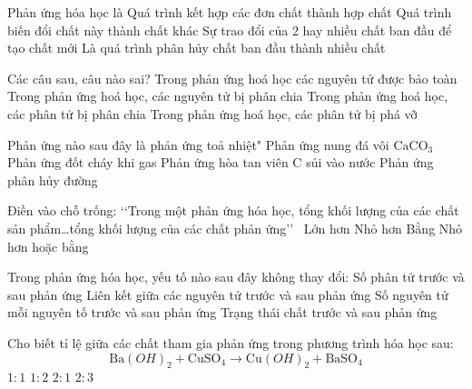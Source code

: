 \begin{ex}
	Phản ứng hóa học là
	\choice
	{Quá trình kết hợp các đơn chất thành hợp chất}
	{Quá trình biến đổi chất này thành chất khác}
	{Sự trao đổi của 2 hay nhiều chất ban đầu để tạo chất mới}
	{Là quá trình phân hủy chất ban đầu thành nhiều chất}
	\loigiai{}
\end{ex}

\begin{ex}
	Các câu sau, câu nào sai?
	\choice
	{Trong phản ứng hoá học các nguyên tử được bảo toàn}
	{Trong phản ứng hoá học, các nguyên tử bị phân chia}
	{Trong phản ứng hoá học, các phân tử bị phân chia}
	{Trong phản ứng hoá học, các phân tử bị phá vỡ}
	\loigiai{}
\end{ex}

\begin{ex}
	Phản ứng nào sau đây là phản ứng toả nhiệt"
	\choice
	{Phản ứng nung đá vôi $\mathrm{CaCO}_3$}
	{Phản ứng đốt cháy khi gas}
	{Phản ứng hòa tan viên C sủi vào nước}
	{Phản ứng phân hủy đường}
	\loigiai{}
\end{ex}

\begin{ex}
	Điền vào chỗ trống: \lq\lq Trong một phản ứng hóa học, tổng khối lượng của các chất sản phẩm\ldots tổng khối lượng của các chất phản ứng\rq\rq\
	\choice
	{Lớn hơn}
	{Nhỏ hơn}
	{Bằng}
	{Nhỏ hơn hoặc bằng}
	\loigiai{}
\end{ex}

\begin{ex}
	Trong phản ứng hóa học, yếu tố nào sau đây không thay đổi:
	\choice
	{Số phân tử trước và sau phản ứng}
	{Liên kết giữa các nguyên tử trước và sau phản ứng}
	{Số nguyên tử mỗi nguyên tố trước và sau phản ứng}
	{Trạng thái chất trước và sau phản ứng}
	\loigiai{}
\end{ex}

\begin{ex}
	Cho biết tỉ lệ giữa các chất tham gia phản ứng trong phương trình hóa học sau:
	$$ 
	\mathrm{Ba}(OH)_2+\mathrm{CuSO}_4 \to \mathrm{Cu}(OH)_2+\mathrm{BaSO}_4
	$$ 
	\choice
	{$1:1$}
	{$1:2$}
	{$2:1$}
	{$2:3$}
	\loigiai{}
\end{ex}

